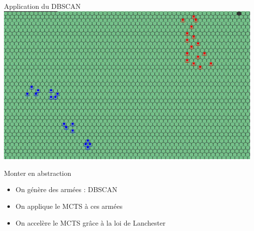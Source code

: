 \documentclass[french]{beamer}
\begin{document}
\begin{frame}{Application du DBSCAN}
	\centering
	\includegraphics[width=0.99\textwidth]{groupes screen.jpg}
\end{frame}
\begin{frame}{Monter en abstraction}
\begin{itemize}
	\item On génère des armées : DBSCAN
	\item On applique le MCTS à ces armées
	\item On accelère le MCTS grâce à la loi de Lanchester
\end{itemize}
\end{frame}
\end{document}
